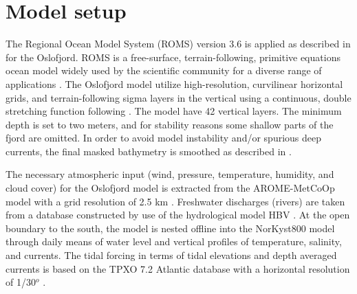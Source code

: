 \section{Model setup}

The Regional Ocean Model System (ROMS) version 3.6 is applied as described in \cite{roed16} for the Oslofjord. ROMS is a free-surface, terrain-following, primitive equations ocean model widely used by the scientific community for a diverse range of applications \cite[]{shchepetkin05,shchepetkin09,haidvogel08}. 
The Oslofjord model utilize high-resolution, curvilinear horizontal grids, and terrain-following sigma layers in the vertical using a continuous, double stretching function following \cite{shchepetkin09}. The model have 42 vertical layers. The minimum depth is set to two meters, and for stability reasons some shallow parts of the fjord are omitted. In order to avoid model instability and/or spurious deep currents, the final masked bathymetry is smoothed as described in \cite{roed16}.



The necessary atmospheric input (wind, pressure, temperature, humidity, and cloud cover) for the Oslofjord model is extracted from the AROME-MetCoOp model with a grid resolution of 2.5 km \cite[]{muller2015}. Freshwater discharges (rivers) are taken from a database constructed by use of the hydrological model HBV \cite[]{beldring2003}. At the open boundary to the south, the model is nested offline into the NorKyst800 model \cite[]{albretsen11} through daily means of water level and vertical profiles of temperature, salinity, and currents.  
The tidal forcing in terms of tidal elevations and depth averaged currents is based on the TPXO 7.2 Atlantic database with a horizontal resolution of 1/30$^o$ \cite[]{egbert02}.


